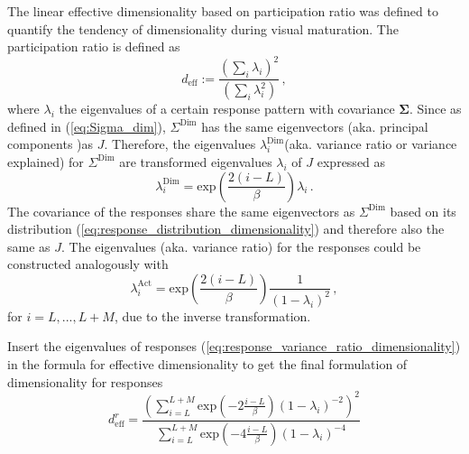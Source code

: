 \documentclass[11pt]{article}
\begin{document}
	The linear effective dimensionality based on participation ratio was defined %
	to quantify the tendency of dimensionality during visual maturation.
	The participation ratio is defined as %
		\begin{equation} \label{eq:effective_dimensionality_analytical}
			d_{\text{eff}} := \frac{\left(\sum_{i} \lambda_i\right)^2}{\left( \sum_{i} \lambda_i^2\right)} \, ,
		\end{equation}
	where $\lambda_i$ the eigenvalues of a certain response pattern with covariance $\mathbf{\Sigma}$. Since as defined in (\ref{eq:Sigma_dim}), $\Sigma^{\text{Dim}}$ has the same eigenvectors (aka. principal components )as $J$. Therefore, the eigenvalues $\lambda_i^{\text{Dim}}$(aka. variance ratio or variance explained) for $\Sigma^{\text{Dim}}$ are transformed eigenvalues $\lambda_i$ of $J$ expressed as
		\begin{equation}
			\lambda_i^{\text{Dim}} = \text{exp}\left(\frac{2(i-L)}{\beta}\right) \lambda_i \, .
		\end{equation}
	The covariance of the responses share the same eigenvectors as $\Sigma^{\text{Dim}}$ based on its distribution (\ref{eq:response_distribution_dimensionality}) and therefore also the same as $J$. The eigenvalues (aka. variance ratio) for the responses could be constructed analogously with
		\begin{equation} \label{eq:response_variance_ratio_dimensionality}
			\lambda_i^{\text{Act}} = \text{exp}\left(\frac{2(i-L)}{\beta}\right) \frac{1}{(1-\lambda_i)^2} \, ,
		\end{equation}
	for $i = L, ..., L+M$, due to the inverse transformation. 
	
	Insert the eigenvalues of responses (\ref{eq:response_variance_ratio_dimensionality}) in the formula for effective dimensionality to get the final formulation of dimensionality for responses
		\begin{equation} \label{eq:dim_analytical_sym}
			d^r_{\text{eff}} = \frac{\left(\sum_{i = L}^{L + M} \text{exp}\left(-2 \frac{i-L}{\beta}\right)(1-\lambda_i)^{-2}\right)^2}{\sum_{i=L}^{L+M} \text{exp}\left(-4 \frac{i-L}{\beta}\right)(1-\lambda_i)^{-4}}
		\end{equation}
	
\end{document}
